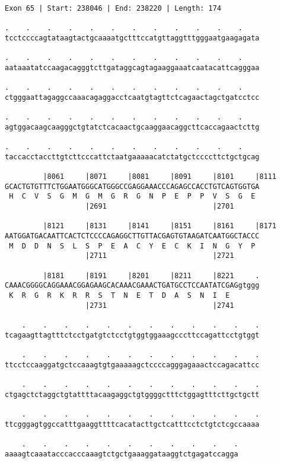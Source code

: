 \documentclass{article}
\begin{document}
\newpage
\begin{Verbatim}
Exon 65 | Start: 238046 | End: 238220 | Length: 174
 
.    .    .    .    .    .    .    .    .    .    .    .    
tcctccccagtataagtactgcaaaatgctttccatgttaggtttgggaatgaagagata
  
.    .    .    .    .    .    .    .    .    .    .    .    
aataaatatccaagacagggtcttgataggcagtagaaggaaatcaatacattcagggaa
  
.    .    .    .    .    .    .    .    .    .    .    .    
ctgggaattagaggccaaacagaggacctcaatgtagttctcagaactagctgatcctcc
  
.    .    .    .    .    .    .    .    .    .    .    .    
agtggacaagcaagggctgtatctcacaactgcaaggaacaggcttcaccagaactcttg
  
.    .    .    .    .    .    .    .    .    .    .    .    
taccacctaccttgtcttcccattctaatgaaaaacatctatgctccccttctgctgcag
  
         |8061     |8071     |8081     |8091     |8101     |8111
GCACTGTGTTTCTGGAATGGGCATGGGCCGAGGAAACCCAGAGCCACCTGTCAGTGGTGA
 H  C  V  S  G  M  G  M  G  R  G  N  P  E  P  P  V  S  G  E 
                   |2691                         |2701      
  
         |8121     |8131     |8141     |8151     |8161     |8171
AATGGATGACAATTCACTCTCCCCAGAGGCTTGTTACGAGTGTAAGATCAATGGCTACCC
 M  D  D  N  S  L  S  P  E  A  C  Y  E  C  K  I  N  G  Y  P 
                   |2711                         |2721      
  
         |8181     |8191     |8201     |8211     |8221     .
CAAACGGGGCAGGAAACGGAGAAGCACAAACGAAACTGATGCCTCCAATATCGAGgtggg
 K  R  G  R  K  R  R  S  T  N  E  T  D  A  S  N  I  E       
                   |2731                         |2741      
  
    .    .    .    .    .    .    .    .    .    .    .    .
tcagaagttagtttctcctgatgtctcctgtggtggaaagcccttccagattcctgtggt
  
    .    .    .    .    .    .    .    .    .    .    .    .
ttcctccaaggatgctccaaagtgtgaaaaagctccccagggagaaactccagacattcc
  
    .    .    .    .    .    .    .    .    .    .    .    .
ctgagctctaggctgtattttacaagaggctgtggggctttctggagtttcttgctgctt
  
    .    .    .    .    .    .    .    .    .    .    .    .
ttcgggagtggccatttgaaggttttcacatacttgctcatttcctctgtctcgccaaaa
  
    .    .    .    .    .    .    .    .    .    .    .
aaaagtcaaatacccacccaaagtctgctgaaaggataaggtctgagatccagga
\end{Verbatim}
\end{document}
